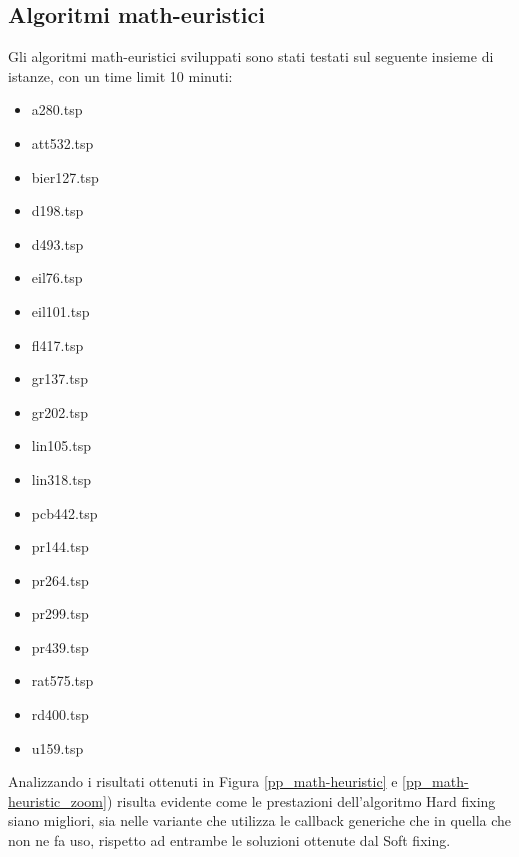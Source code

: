 \vspace{2cm}
\subsection{Algoritmi math-euristici}
Gli algoritmi math-euristici sviluppati sono stati testati sul seguente insieme di istanze, con un time limit 10 minuti:
\begin{center}
\begin{multicols}{3}
\begin{itemize}
\item{a280.tsp}  
\item{att532.tsp} 
\item{bier127.tsp}
\item{d198.tsp}   
\item{d493.tsp}   
\item{eil76.tsp}  
\item{eil101.tsp} 
\item{fl417.tsp}  
\item{gr137.tsp}  
\item{gr202.tsp}  
\item{lin105.tsp} 
\item{lin318.tsp} 
\item{pcb442.tsp} 
\item{pr144.tsp}  
\item{pr264.tsp}  
\item{pr299.tsp}  
\item{pr439.tsp}  
\item{rat575.tsp} 
\item{rd400.tsp}  
\item{u159.tsp}
\end{itemize}
\end{multicols}
\end{center}
Analizzando i risultati ottenuti in Figura \ref{pp_math-heuristic} e \ref{pp_math-heuristic_zoom}) risulta evidente come le prestazioni dell'algoritmo Hard fixing siano migliori, sia nelle variante che utilizza le callback generiche che in quella che non ne fa uso, rispetto ad entrambe le soluzioni ottenute dal Soft fixing.
